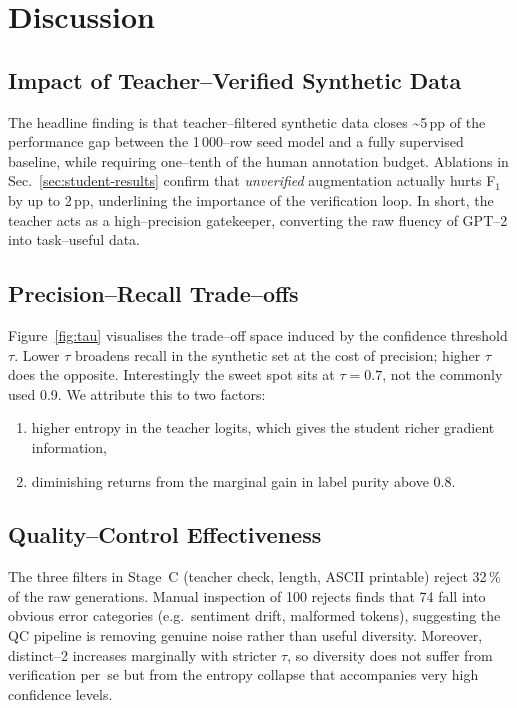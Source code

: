\documentclass[11pt]{article}
\begin{document}
\section{Discussion}
\label{sec:discussion}

\subsection{Impact of Teacher--Verified Synthetic Data}
The headline finding is that teacher--filtered synthetic data
closes \textasciitilde5\,pp of the performance gap between the
1\,000--row seed model and a fully supervised baseline, while requiring
one--tenth of the human annotation budget.  Ablations in
Sec.~\ref{sec:student-results} confirm that \emph{unverified} augmentation
actually hurts F$_1$ by up to 2\,pp, underlining the importance of the
verification loop.  In short, the teacher acts as a high--precision
gatekeeper, converting the raw fluency of GPT--2 into task--useful data.

\subsection{Precision--Recall Trade--offs}
Figure~\ref{fig:tau} visualises the trade--off space induced by the
confidence threshold $\tau$.  Lower $\tau$ broadens recall in the
synthetic set at the cost of precision; higher $\tau$ does the
opposite.  Interestingly the sweet spot sits at $\tau=0.7$, not the
commonly used 0.9.  We attribute this to two factors:

\begin{enumerate}
  \item higher entropy in the teacher logits, which gives the student
    richer gradient information,
  \item diminishing returns from the marginal gain in label purity
    above 0.8.
\end{enumerate}

\subsection{Quality--Control Effectiveness}
The three filters in Stage~C (teacher check, length, ASCII printable)
reject 32\,\% of the raw generations.  Manual inspection of
100 rejects finds that 74 fall into obvious error categories
(e.g.\ sentiment drift, malformed tokens), suggesting the QC
pipeline is removing genuine noise rather than useful diversity.
Moreover, distinct--2 increases marginally with stricter $\tau$, so
diversity does not suffer from verification per~se but from the
entropy collapse that accompanies very high confidence levels.
\end{document}
